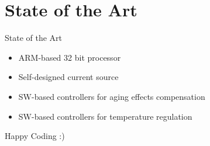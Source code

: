 \documentclass[apectratio=169]{beamer}
\begin{document}
 \section{State of the Art}
  	\begin{frame}{State of the Art}
		\begin{itemize}
			\item<1-> ARM-based 32 bit processor
			\item<2-> Self-designed current source
			\item<3-> SW-based controllers for aging effects compensation
			\item<4-> SW-based controllers for temperature regulation
		\end{itemize}
  	\end{frame}	
  \begin{frame}[standout]
	Happy Coding :) 
  \end{frame}
\end{document}
